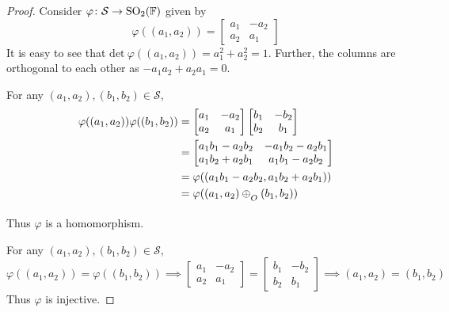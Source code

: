 \begin{proof}
    Consider $\varphi\colon\mathcal{S} \to \mathrm{SO}_{2}(\mathbb{F})$ given by
    \[ \varphi((a_1,a_2)) = \begin{bmatrix}a_1 & -a_2 \\ a_2 & a_1\end{bmatrix} \]
    It is easy to see that $\mathrm{det}\ \varphi((a_1,a_2))=a_1^2+a_2^2=1$.
    Further, the columns are orthogonal to each other as $-a_1 a_2 + a_2 a_1 = 0$.
    \vspace{1ex}

    \noindent
    For any $(a_1,a_2),(b_1,b_2)\in\mathcal{S}$,
    \begin{align*}
        \varphi((a_1,a_2))\varphi((b_1,b_2))
            &= \begin{bmatrix}a_1 & -a_2 \\ a_2 & a_1\end{bmatrix} \begin{bmatrix}b_1 & -b_2 \\ b_2 & b_1\end{bmatrix} \\
            &= \begin{bmatrix}a_1 b_1 - a_2 b_2 & -a_1 b_2 - a_2 b_1 \\ a_1 b_2 + a_2 b_1 & a_1 b_1 - a_2 b_2\end{bmatrix} \\
            &= \varphi((a_1 b_1 - a_2 b_2, a_1 b_2 + a_2 b_1)) \\
            &= \varphi((a_1,a_2)\conop(b_1,b_2))
    \end{align*}
    Thus $\varphi$ is a homomorphism.
    \vspace{1ex}

    \noindent
    For any $(a_1,a_2),(b_1,b_2)\in\mathcal{S}$,
    \[
        \varphi((a_1,a_2)) = \varphi((b_1,b_2))
        \implies \begin{bmatrix}a_1 & -a_2 \\ a_2 & a_1\end{bmatrix} = \begin{bmatrix}b_1 & -b_2 \\ b_2 & b_1\end{bmatrix}
        \implies (a_1,a_2) = (b_1, b_2)
    \]
    Thus $\varphi$ is injective.
    \vspace{1ex}


\end{proof}

